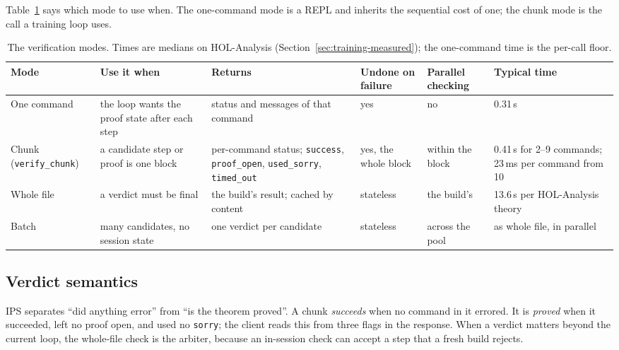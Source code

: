 \documentclass[11pt]{article}
\newcommand{\code}[1]{\colorbox{gray!12}{\texttt{\vphantom{Ag}#1}}}
\begin{document}
Table~\ref{tab:modes} says which mode to use when. The one-command mode
is a REPL and inherits the sequential cost of one; the chunk mode is the
call a training loop uses.

\begin{table}[!htb]
\centering\small
\begin{tabularx}{\textwidth}{@{}l >{\raggedright\arraybackslash}X >{\raggedright\arraybackslash}X l l l@{}}
\toprule
Mode & Use it when & Returns & Undone on failure & Parallel checking & Typical time \\
\midrule
One command & the loop wants the proof state after each step & status and messages of that command & yes & no & 0.31\,s \\
Chunk (\code{verify\_chunk}) & a candidate step or proof is one block & per-command status; \code{success}, \code{proof\_open}, \code{used\_sorry}, \code{timed\_out} & yes, the whole block & within the block & 0.41\,s for 2--9 commands; 23\,ms per command from 10 \\
Whole file & a verdict must be final & the build's result; cached by content & stateless & the build's & 13.6\,s per HOL-Analysis theory \\
Batch & many candidates, no session state & one verdict per candidate & stateless & across the pool & as whole file, in parallel \\
\bottomrule
\end{tabularx}
\caption{The verification modes. Times are medians on HOL-Analysis
  (Section~\ref{sec:training-measured}); the one-command time is the
  per-call floor.}
\label{tab:modes}
\end{table}

\subsection{Verdict semantics}
\label{sec:verdict}

IPS separates ``did anything error'' from ``is the theorem proved''. A
chunk \emph{succeeds} when no command in it errored. It is \emph{proved}
when it succeeded, left no proof open, and used no \code{sorry}; the
client reads this from three flags in the response. When a verdict
matters beyond the current loop, the whole-file check is the arbiter,
because an in-session check can accept a step that a fresh build rejects.
\end{document}
